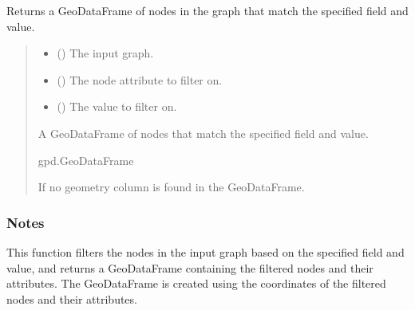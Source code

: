 \documentclass[letterpaper,10pt,english]{sphinxmanual}
\begin{document}
\begin{fulllineitems}
\label{\detokenize{pysewer:pysewer.helper.get_node_gdf}}
\pysigstartsignatures
{}
\pysigstopsignatures
\sphinxAtStartPar
Returns a GeoDataFrame of nodes in the graph that match the specified field and value.
\begin{quote}\begin{description}
\begin{itemize}
\item {} 
\sphinxAtStartPar
{} () \textendash{} The input graph.

\item {} 
\sphinxAtStartPar
{} (\sphinxstyleliteralemphasis{\sphinxupquote{, }}) \textendash{} The node attribute to filter on.

\item {} 
\sphinxAtStartPar
{} (\sphinxstyleliteralemphasis{\sphinxupquote{, }}) \textendash{} The value to filter on.

\end{itemize}

\sphinxAtStartPar
{} \textendash{} A GeoDataFrame of nodes that match the specified field and value.

\sphinxAtStartPar
gpd.GeoDataFrame

\sphinxAtStartPar
{} \textendash{} If no geometry column is found in the GeoDataFrame.

\end{description}\end{quote}
\subsubsection*{Notes}

\sphinxAtStartPar
This function filters the nodes in the input graph based on the specified field and value, and returns a GeoDataFrame
containing the filtered nodes and their attributes. The GeoDataFrame is created using the coordinates of the filtered
nodes and their attributes.

\end{fulllineitems}
\end{document}
